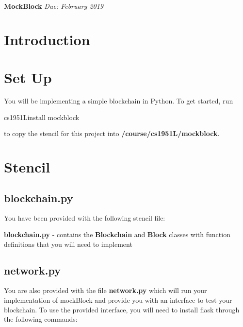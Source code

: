 \documentclass{article}
\begin{document}
\begin{center}
    \Large\textbf{MockBlock}
    \large\textit{Due: February 2019}
\end{center}

\tableofcontents

\section{Introduction}

\section{Set Up}

You will be implementing a simple blockchain in Python. To get started, run \par \vspace{5mm} 

\hspace*{6mm} cs1951L\textunderscore install mockblock \par \vspace{5mm}

to copy the stencil for this project into \textbf{/course/cs1951L/mockblock}.

\section{Stencil}
\subsection{blockchain.py}
You have been provided with the following stencil file: \par \vspace{5mm} 

\textbf{blockchain.py} - contains the \textbf{Blockchain} and \textbf{Block} classes with function definitions that you will need to implement \par \vspace{5mm}

\subsection{network.py}
You are also provided with the file \textbf{network.py} which will run your implementation of mockBlock and provide you with an interface to test your blockchain. To use the provided interface, you will need to install flask through the following commands: \par \vspace{5mm}
\end{document}
